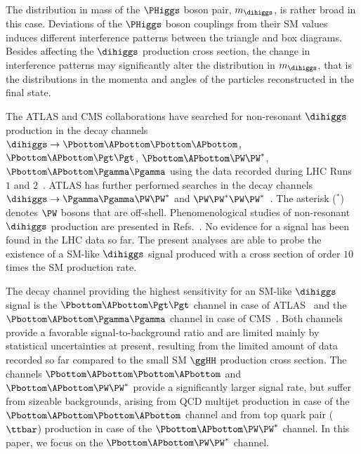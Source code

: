 The distribution in mass of the $\PHiggs$ boson pair, $m_{\dihiggs}$, is rather broad in this case.
Deviations of the $\PHiggs$ boson couplings from their SM values
induces different interference patterns between the triangle and box diagrams.
Besides affecting the $\dihiggs$ production cross section,
the change in interference patterns may  significantly alter the distribution in $m_{\dihiggs}$,
that is the distributions in the momenta and angles of the particles reconstructed in the final state.

The ATLAS and CMS collaborations have searched for non-resonant $\dihiggs$ production in the decay channels 
$\dihiggs \to \Pbottom\APbottom\Pbottom\APbottom$, $\Pbottom\APbottom\Pgt\Pgt$, $\Pbottom\APbottom\PW\PW^{\ast}$, $\Pbottom\APbottom\Pgamma\Pgamma$
using the data recorded during LHC Runs $1$ and $2$~\cite{HIG-13-032,HIG-15-013,HIG-17-030,Sirunyan:2020xok,Aad:2015xja,Aaboud:2018knk,Aaboud:2018ftw,Aaboud:2018sfw,Aaboud:2018zhh}.
ATLAS has further performed searches in the decay channels $\dihiggs \to \Pgamma\Pgamma\PW\PW^{\ast}$ and $\PW\PW^{\ast}\PW\PW^{\ast}$~\cite{Aad:2015xja,Aaboud:2018ewm,Aaboud:2018ksn}.
The asterisk ($^{\ast}$) denotes $\PW$ bosons that are off-shell.
Phenomenological studies of non-resonant $\dihiggs$ production are presented in 
Refs.~\cite{Baur:2002rb,Baur:2002qd,Baur:2003gpa,Baur:2003gp,Dolan:2012rv,Papaefstathiou:2012qe,Baglio:2012np,deLima:2014dta,Wardrope:2014kya,Behr:2015oqq,Li:2015yia,Adhikary:2017jtu}.
No evidence for a signal has been found in the LHC data so far.
The present analyses are able to probe the existence of a SM-like $\dihiggs$ signal produced with a cross section of order $10$ times the SM production rate.

The decay channel providing the highest sensitivity for an SM-like $\dihiggs$ signal 
is the $\Pbottom\APbottom\Pgt\Pgt$ channel in case of ATLAS~\cite{Aaboud:2018sfw} and the $\Pbottom\APbottom\Pgamma\Pgamma$ channel in case of CMS~\cite{Sirunyan:2020xok}.
Both channels provide a favorable signal-to-background ratio and are limited mainly by statistical uncertainties at present,
resulting from the limited amount of data recorded so far compared to the small SM $\ggHH$ production cross section.
The channels $\Pbottom\APbottom\Pbottom\APbottom$ and $\Pbottom\APbottom\PW\PW^{\ast}$ provide a significantly larger signal rate,
but suffer from sizeable backgrounds,
arising from QCD multijet production in case of the $\Pbottom\APbottom\Pbottom\APbottom$ channel 
and from top quark pair ($\ttbar$) production in case of the $\Pbottom\APbottom\PW\PW^{\ast}$ channel.
In this paper, we focus on the $\Pbottom\APbottom\PW\PW^{\ast}$ channel.
 
